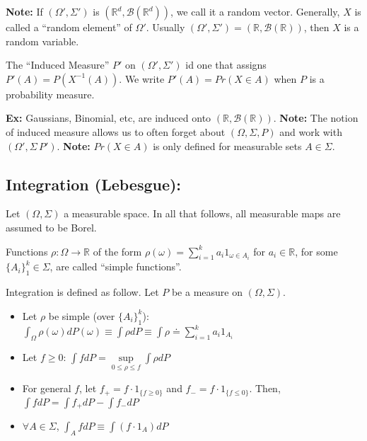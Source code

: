 \documentclass[twoside]{article}
\begin{document}
\textbf{Note:} If $(\Omega', \Sigma')$ is $(\mathbb{R}^d, \mathcal{B}(\mathbb{R}^d))$, we call it a random vector. Generally, $X$ is called a ``random element'' of $\Omega'$. Usually $(\Omega', \Sigma') = (\mathbb{R}, \mathcal{B}(\mathbb{R}))$, then $X$ is a random variable.

\begin{definition}
  The ``Induced Measure'' $P'$ on $(\Omega', \Sigma')$ id one that assigns $P'(A) = P(X^{-1}(A))$. We write $P'(A) = Pr(X \in A)$ when $P$ is a probability measure.
\end{definition}

\textbf{Ex:} Gaussians, Binomial, etc, are induced onto $(\mathbb{R}, \mathcal{B}(\mathbb{R}))$.
\textbf{Note: } The notion of induced measure allows us to often forget about $(\Omega, \Sigma, P)$ and work with $(\Omega', \Sigma\, P')$.
\textbf{Note: } $Pr(X \in A)$ is only defined for measurable sets $A \in \Sigma$.

\subsection{Integration (Lebesgue):}

Let $(\Omega, \Sigma)$ a measurable space. In all that follows, all measurable maps are assumed to be Borel.

\begin{definition}
  Functions $\rho: \Omega \rightarrow \mathbb{R}$ of the form $\rho(\omega) = \sum\limits_{i=1}^k a_i1_{\omega \in A_i}$ for $a_i \in \mathbb{R}$, for some $\{A_i\}_1^k \in \Sigma$, are called ``simple functions''.
\end{definition}

\begin{definition}
  Integration is defined as follow. Let $P$ be a measure on $(\Omega, \Sigma)$.
  \begin{itemize}
    \item Let $\rho$ be simple (over $\{A_i\}_1^k$): $\int_\Omega \rho(\omega) dP(\omega) \equiv \int \rho dP \equiv \int \rho \doteq \sum\limits_{i=1}^k a_i 1_{A_i}$
    \item Let $f \geq 0$: $\int f dP = \sup\limits_{0 \leq \rho \leq f} \int \rho dP$
    \item For general $f$, let $f_+ = f \cdot 1_{\{f \geq 0\}}$ and $f_- = f \cdot 1_{\{f \leq 0\}}$. Then, $\int f dP = \int f_+ dP - \int f_- dP$
    \item $\forall A \in \Sigma$, $\int_A f dP \equiv \int (f \cdot 1_A)dP$
  \end{itemize}
\end{definition}
\end{document}
